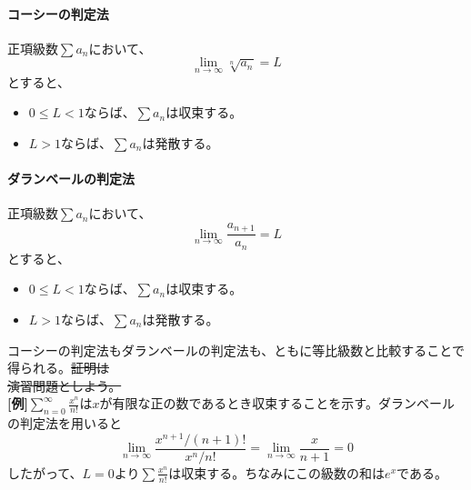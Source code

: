 \documentclass[a4j,dvipdfmx]{jsarticle}
\begin{document}
                \paragraph{コーシーの判定法}正項級数$\sum a_n$において、
                \begin{equation}
                    \lim_{n\to \infty}\sqrt[n]{a_n} = L \label{eq:コーシーの判定法}
                \end{equation}
                とすると、
                \begin{itemize}
                    \item $0\leq L <1$ならば、$\sum a_n$は収束する。
                    \item $L>1$ならば、$\sum a_n$は発散する。
                \end{itemize}
                \paragraph{ダランベールの判定法}正項級数$\sum a_n$において、
                \begin{equation}
                    \lim_{n\to \infty}\frac{a_{n+1}}{a_n}=L\label{eq:ダランベールの判定法}
                \end{equation}
                とすると、
                \begin{itemize}
                    \item $0\leq L <1$ならば、$\sum a_n$は収束する。
                    \item $L>1$ならば、$\sum a_n$は発散する。
                \end{itemize}
                \clearpage
                コーシーの判定法もダランベールの判定法も、ともに等比級数と比較することで得られる。\sout{証明は}\\\sout{演習問題としよう。}\\

                \textbf{[例]}\hspace{1mm}$\displaystyle \sum_{n=0}^\infty \frac{x^n}{n!}$は$x$が有限な正の数であるとき収束することを示す。ダランベールの判定法を用いると
                \begin{equation*}
                    \lim_{n\to\infty}\frac{{x^{n+1}}/{(n+1)!}}{{x^n}/{n!}}=\lim_{n\to\infty}\frac{x}{n+1}=0
                \end{equation*}
                したがって、$L=0$より$\displaystyle\sum \frac{x^n}{n!}$は収束する。ちなみにこの級数の和は$e^x$である。\\
\end{document}
